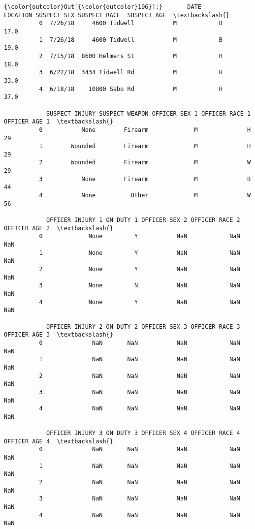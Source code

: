 \documentclass[11pt]{article}
\begin{document}
\begin{Verbatim}[commandchars=\\\{\}]
{\color{outcolor}Out[{\color{outcolor}196}]:}       DATE         LOCATION SUSPECT SEX SUSPECT RACE  SUSPECT AGE  \textbackslash{}
          0  7/26/18     4600 Tidwell           M            B         17.0   
          1  7/26/18     4600 Tidwell           M            B         19.0   
          2  7/15/18  8600 Helmers St           M            H         18.0   
          3  6/22/18  3434 Tidwell Rd           M            H         33.0   
          4  6/18/18    10800 Sabo Rd           M            H         37.0   
          
            SUSPECT INJURY SUSPECT WEAPON OFFICER SEX 1 OFFICER RACE 1  OFFICER AGE 1  \textbackslash{}
          0           None        Firearm             M              H             29   
          1        Wounded        Firearm             M              H             29   
          2        Wounded        Firearm             M              W             29   
          3           None        Firearm             M              B             44   
          4           None          Other             M              W             56   
          
            OFFICER INJURY 1 ON DUTY 1 OFFICER SEX 2 OFFICER RACE 2  OFFICER AGE 2  \textbackslash{}
          0             None         Y           NaN            NaN            NaN   
          1             None         Y           NaN            NaN            NaN   
          2             None         Y           NaN            NaN            NaN   
          3             None         N           NaN            NaN            NaN   
          4             None         Y           NaN            NaN            NaN   
          
            OFFICER INJURY 2 ON DUTY 2 OFFICER SEX 3 OFFICER RACE 3  OFFICER AGE 3  \textbackslash{}
          0              NaN       NaN           NaN            NaN            NaN   
          1              NaN       NaN           NaN            NaN            NaN   
          2              NaN       NaN           NaN            NaN            NaN   
          3              NaN       NaN           NaN            NaN            NaN   
          4              NaN       NaN           NaN            NaN            NaN   
          
            OFFICER INJURY 3 ON DUTY 3 OFFICER SEX 4 OFFICER RACE 4  OFFICER AGE 4  \textbackslash{}
          0              NaN       NaN           NaN            NaN            NaN   
          1              NaN       NaN           NaN            NaN            NaN   
          2              NaN       NaN           NaN            NaN            NaN   
          3              NaN       NaN           NaN            NaN            NaN   
          4              NaN       NaN           NaN            NaN            NaN   
          

\end{Verbatim}
\end{document}
